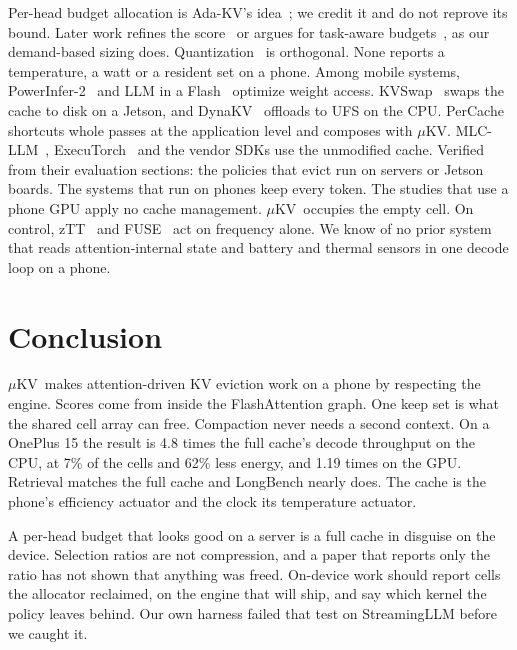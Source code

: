 \documentclass[sigconf, anonymous=false, screen=true, 10pt]{acmart}
\newcommand{\muKV}{$\mu$KV}
\begin{document}
Per-head budget allocation is Ada-KV's idea~\cite{feng2025adakv}; we credit it and do not reprove its bound. Later work refines the score~\cite{feng2025criticalkv} or argues for task-aware budgets~\cite{cai2025rkv}, as our demand-based sizing does. Quantization~\cite{liu2024kivi,kim2025kvzip} is orthogonal. None reports a temperature, a watt or a resident set on a phone. Among mobile systems, PowerInfer-2~\cite{song2024powerinfer2} and LLM in a Flash~\cite{alizadeh2023llm} optimize weight access. KVSwap~\cite{kvswap2025} swaps the cache to disk on a Jetson, and DynaKV~\cite{dynakv2025} offloads to UFS on the CPU. PerCache~\cite{liu2025percache} shortcuts whole passes at the application level and composes with \muKV. MLC-LLM~\cite{mlcllm}, ExecuTorch~\cite{executorch} and the vendor SDKs use the unmodified cache. Verified from their evaluation sections: the policies that evict run on servers or Jetson boards. The systems that run on phones keep every token. The studies that use a phone GPU apply no cache management. \muKV\ occupies the empty cell. On control, zTT~\cite{kim2021ztt} and FUSE~\cite{liu2022fuse} act on frequency alone. We know of no prior system that reads attention-internal state and battery and thermal sensors in one decode loop on a phone.

\section{Conclusion}
\label{sec:conclusion}

\muKV\ makes attention-driven KV eviction work on a phone by respecting the engine. Scores come from inside the FlashAttention graph. One keep set is what the shared cell array can free. Compaction never needs a second context. On a OnePlus 15 the result is 4.8 times the full cache's decode throughput on the CPU, at 7\% of the cells and 62\% less energy, and 1.19 times on the GPU. Retrieval matches the full cache and LongBench nearly does. The cache is the phone's efficiency actuator and the clock its temperature actuator.

A per-head budget that looks good on a server is a full cache in disguise on the device. Selection ratios are not compression, and a paper that reports only the ratio has not shown that anything was freed. On-device work should report cells the allocator reclaimed, on the engine that will ship, and say which kernel the policy leaves behind. Our own harness failed that test on StreamingLLM before we caught it.
\end{document}
